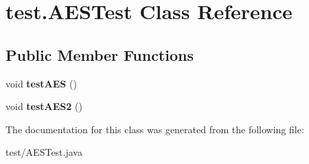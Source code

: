 \hypertarget{classtest_1_1_a_e_s_test}{
\section{test.\-A\-E\-S\-Test \-Class \-Reference}
\label{classtest_1_1_a_e_s_test}
}
\subsection*{\-Public \-Member \-Functions}
\begin{DoxyCompactItemize}
\item 
\hypertarget{classtest_1_1_a_e_s_test_a78eef84641518240184cb1698bf637b8}{
void {\bfseries test\-A\-E\-S} ()}
\label{classtest_1_1_a_e_s_test_a78eef84641518240184cb1698bf637b8}

\item 
\hypertarget{classtest_1_1_a_e_s_test_a75da4da83cf955a224edb410b4f54012}{
void {\bfseries test\-A\-E\-S2} ()}
\label{classtest_1_1_a_e_s_test_a75da4da83cf955a224edb410b4f54012}

\end{DoxyCompactItemize}


\-The documentation for this class was generated from the following file\-:\begin{DoxyCompactItemize}
\item 
test/\-A\-E\-S\-Test.\-java\end{DoxyCompactItemize}
